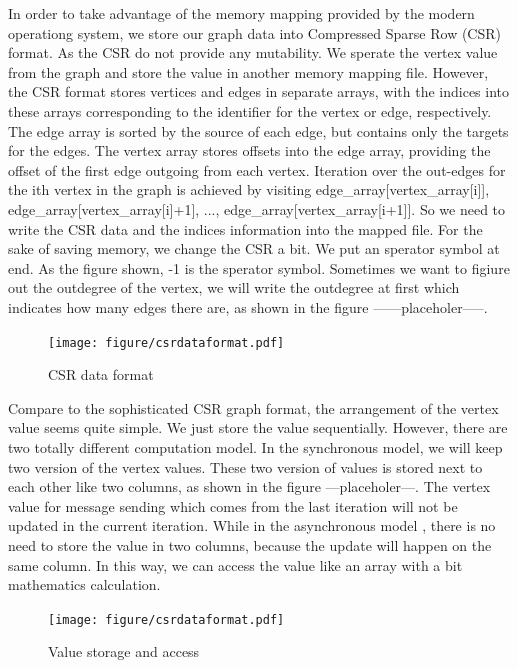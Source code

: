 \documentclass[twocolumn,a4paper,10pt]{article}
\begin{document}
In order to take advantage of the memory mapping provided by the modern operationg system, we store our graph data into Compressed Sparse Row (CSR) format. As the CSR do not provide any mutability. We sperate the vertex value from the graph and store the value in another memory mapping file.  However, the CSR format stores vertices and edges in separate arrays, with the indices into these arrays corresponding to the identifier for the vertex or edge, respectively. The edge array is sorted by the source of each edge, but contains only the targets for the edges. The vertex array stores offsets into the edge array, providing the offset of the first edge outgoing from each vertex. Iteration over the out-edges for the ith vertex in the graph is achieved by visiting edge_array[vertex_array[i]], edge_array[vertex_array[i]+1], ..., edge_array[vertex_array[i+1]].  
So we need to write the CSR data and the indices information into the mapped file. For the sake of saving memory, we change the CSR a bit. We put an sperator symbol at end. As the figure shown, -1 is the sperator symbol. Sometimes we want to figiure out the outdegree of the vertex, we will write the outdegree at first which indicates how many edges there are, as shown in the figure ------placeholer-----.

\begin{figure}[htbp]
\centering
 \begin{minipage}[]{1.4\textwidth}
     \texttt{[image: figure/csrdataformat.pdf]}
\end{minipage}
    \caption{CSR data format}
\end{figure}

Compare to the sophisticated CSR graph format, the arrangement of the vertex value seems quite simple. We just store the value sequentially. However, there are two totally different computation model. In the synchronous model, we will keep two version of the vertex values. These two version of values is stored next to each other like two columns, as shown in the figure ---placeholer---. The vertex value for message sending which comes from the last iteration will not be updated in the current iteration.  While in the asynchronous model , there is no need to store the value in two columns, because the update will happen on the same column. In this way, we can access the value like an array with a bit mathematics calculation.
\begin{figure}[htbp]
\centering
 \begin{minipage}[]{1.4\textwidth}
     \texttt{[image: figure/csrdataformat.pdf]}
\end{minipage}
    \caption{Value storage and access}
\end{figure}
\end{document}
